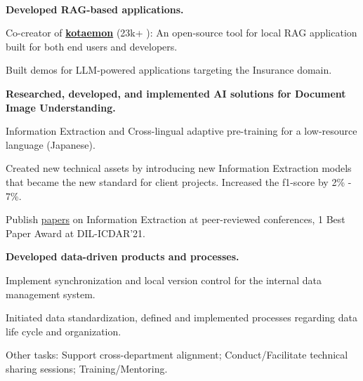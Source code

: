\\
\vspace{-.2em}
\begin{xitemize}
    \item \textbf{Developed RAG-based applications.}
    \begin{zitemize}
\item Co-creator of \href{https://github.com/Cinnamon/kotaemon}{\textbf{kotaemon}}
(23k+ {\scriptsize \faStar}): An
        open-source tool for local RAG application built for both end users and developers.
        \item Built demos for LLM-powered applications targeting the Insurance domain.
    \end{zitemize}
    \item \textbf{Researched, developed, and implemented AI solutions for Document Image Understanding.}
    \begin{zitemize}
        \item Information Extraction and Cross-lingual adaptive pre-training for a
        low-resource language (Japanese).
        \item Created new technical assets by introducing new Information Extraction models that
        became the new standard for client projects. Increased the f1-score by 2\% - 7\%.
        \item Publish \href{https://scholar.google.com/citations?user=\gscholarid}{papers} on
        Information Extraction at peer-reviewed conferences, 1 Best Paper Award
        at DIL-ICDAR'21.
    \end{zitemize}
    \item \textbf{Developed data-driven products and processes.}
    \begin{zitemize}
        \item Implement synchronization and local version control for the internal
        data management system.
        \item Initiated data standardization, defined and implemented processes regarding data life cycle and organization.
    \end{zitemize}
    \item Other tasks: Support cross-department alignment; Conduct/Facilitate technical sharing sessions; Training/Mentoring.
\end{xitemize}

